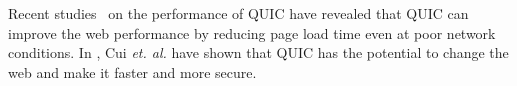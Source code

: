 Recent studies~\cite{Megyesi2016, Carlucci,Lychev2015,Biswal2016} on the performance of \ac{QUIC} have revealed that \ac{QUIC} can improve the web performance by reducing page load time even at poor network conditions.
%
In \cite{Cui2017}, Cui \textit{et. al.} have shown that \ac{QUIC} has the potential to change the web and make it faster and more secure.
